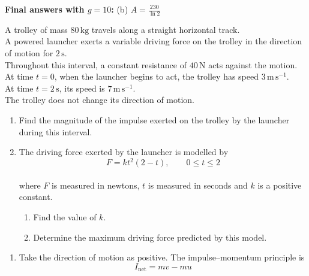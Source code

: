 \documentclass[leqno]{article}
\begin{document}
\begin{enumerate}[
  label=\textbf{\arabic*.},
  leftmargin=*,
  topsep=0pt,
  partopsep=0pt,
  parsep=0pt
]
\begin{djsSolution}
\begin{enumerate}[label=\textbf{(\alph*)}, start=1]
\end{enumerate}
\par\medskip\noindent\textbf{Final answers with \(g = 10\):} (b) \(A=\frac{230}{\ln2}\)
\end{djsSolution}

\newpage

\questionitem

A trolley of mass $80\,\mathrm{kg}$ travels along a straight horizontal track. \\
A powered launcher exerts a variable driving force on the trolley in the direction of motion for $2\,\mathrm{s}$. \\
Throughout this interval, a constant resistance of $40\,\mathrm{N}$ acts against the motion. \\

At time $t=0$, when the launcher begins to act, the trolley has speed $3\,\mathrm{m\,s^{-1}}$. \\
At time $t=2\,\mathrm{s}$, its speed is $7\,\mathrm{m\,s^{-1}}$. \\
The trolley does not change its direction of motion. \\
\begin{enumerate}[label=\textbf{(\alph*)}]
\item Find the magnitude of the impulse exerted on the trolley by the launcher during this interval.  \\
\item The driving force exerted by the launcher is modelled by
\[
F=kt^2(2-t),\qquad 0\leq t\leq 2
\] \\
where $F$ is measured in newtons, $t$ is measured in seconds and $k$ is a positive constant. \\
\begin{enumerate}[label=(\roman*)]
\item Find the value of $k$.  \\
\item Determine the maximum driving force predicted by this model.  \\
\end{enumerate}
\end{enumerate}

\vspace*{10pt}

\begin{djsSolution}
\begin{enumerate}[label=\textbf{(\alph*)}, start=1]
\item Take the direction of motion as positive. The impulse--momentum principle is
\[
I_{\text{net}}=mv-mu
\]


\end{enumerate}
\end{djsSolution}
\end{enumerate}
\end{document}
